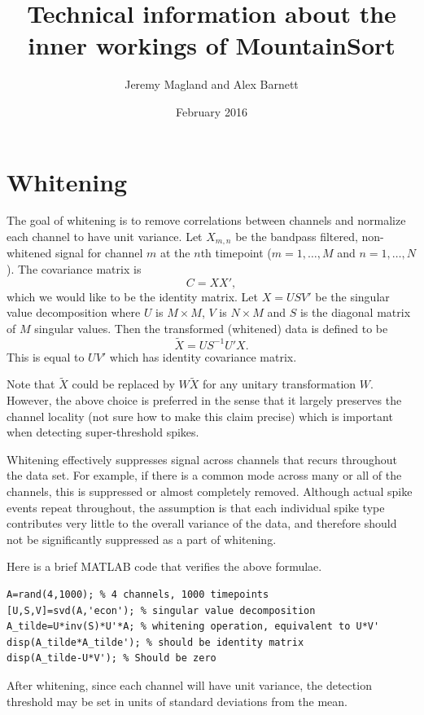 \documentclass{article}
\title{Technical information about the inner workings of MountainSort}
\author{Jeremy Magland and Alex Barnett}
\date{February 2016}
\begin{document}
\maketitle

\section{Whitening}

The goal of whitening is to remove correlations between channels and normalize each channel to have unit variance. Let $X_{m,n}$ be the bandpass filtered, non-whitened signal for channel $m$ at the $n$th timepoint ($m=1,\dots,M$ and $n=1,\dots,N$). The covariance matrix is
$$C=X X',$$
which we would like to be the identity matrix. Let
$X=USV'$ be the singular value decomposition where $U$ is $M\times M$, $V$ is $N\times M$ and $S$ is the diagonal matrix of $M$ singular values.
Then the transformed (whitened) data is defined to be
$$\tilde{X}=US^{-1}U'X.$$
This is equal to $UV'$ which has identity covariance matrix.

Note that $\tilde{X}$ could be replaced by $W\tilde{X}$ for any unitary transformation $W$. However, the above choice is preferred in the sense that it largely preserves the channel locality (not sure how to make this claim precise) which is important when detecting super-threshold spikes.

Whitening effectively suppresses signal across channels that recurs throughout the data set. For example, if there is a common mode across many or all of the channels, this is suppressed or almost completely removed. Although actual spike events repeat throughout, the assumption is that each individual spike type contributes very little to the overall variance of the data, and therefore should not be significantly suppressed as a part of whitening.

Here is a brief MATLAB code that verifies the above formulae.

\begin{lstlisting}
A=rand(4,1000); % 4 channels, 1000 timepoints
[U,S,V]=svd(A,'econ'); % singular value decomposition
A_tilde=U*inv(S)*U'*A; % whitening operation, equivalent to U*V'
disp(A_tilde*A_tilde'); % should be identity matrix
disp(A_tilde-U*V'); % Should be zero
\end{lstlisting}

After whitening, since each channel will have unit variance, the detection threshold may be set in units of standard deviations from the mean.
\end{document}
